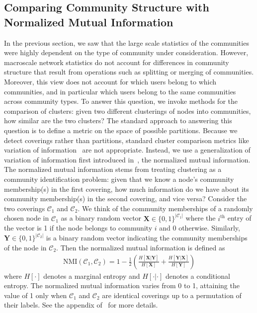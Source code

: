 \documentclass[10pt,letterpaper]{article}
\begin{document}


\subsection{Comparing Community Structure with Normalized Mutual Information}

In the previous section, we saw that the large scale statistics of the communities were highly dependent on the type of community under consideration. However, macroscale network statistics do not account for differences in community structure that result from operations such as splitting or merging of communities. Moreover, this view does not account for which users belong to which communities, and in particular which users belong to the same communities across community types. To answer this question, we invoke methods for the comparison of clusters: given two different clusterings of nodes into communities, how similar are the two clusters? The standard approach to answering this question is to define a metric on the space of possible partitions.  
Because we detect coverings rather than partitions, standard cluster comparison metrics like variation of information~\cite{meilua2003comparing} are not appropriate. Instead, we use a generalization of variation of information first introduced in~\cite{Lancichinetti2009}, the normalized mutual information. The normalized mutual information stems from treating clustering as a community identification problem: given that we know a node's community membership(s) in the first covering, how much information do we have about its community membership(s) in the second covering, and vice versa? Consider the two coverings $\mathcal{C}_{1}$ and $\mathcal{C}_{2}.$ We think of the community memberships of a randomly chosen node in $\mathcal{C}_{1}$ as a binary random vector $\mathbf{X} \in \{0, 1\}^{|\mathcal{C}_{1}|}$ where the $i^{\text{th}}$ entry of the vector is 1 if the node belongs to community $i$ and 0 otherwise. Similarly, $\mathbf{Y} \in \{ 0, 1\}^{|\mathcal{C}_{2}|}$ is a binary random vector indicating the community memberships of the node in $\mathcal{C}_{2}$. Then the normalized mutual information is defined as
\begin{align}
	\text{NMI}(\mathcal{C}_{1}, \mathcal{C}_{2}) = 1 - \frac{1}{2} \left( \frac{H[\mathbf{X} | \mathbf{Y}]}{H[\mathbf{X}]} + \frac{H[\mathbf{Y} | \mathbf{X}]}{H[\mathbf{Y}]}\right)
\end{align}
where $H[\cdot]$ denotes a marginal entropy and $H[\cdot | \cdot]$ denotes a conditional entropy. The normalized mutual information varies from 0 to 1, attaining the value of 1 only when $\mathcal{C}_{1}$ and $\mathcal{C}_{2}$ are identical coverings up to a permutation of their labels. See the appendix of~\cite{Lancichinetti2009} for more details.
\end{document}
